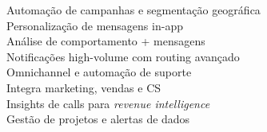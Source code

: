 \begin{commentB}
 Automação de campanhas e segmentação geográfica\\
 Personalização de mensagens in-app\\
 Análise de comportamento + mensagens\\
 Notificações high-volume com routing avançado\\
[0.5em]

 Omnichannel e automação de suporte\\
 Integra marketing, vendas e CS\\
 Insights de calls para \textit{revenue intelligence}\\
 Gestão de projetos e alertas de dados\\
\end{commentB}
